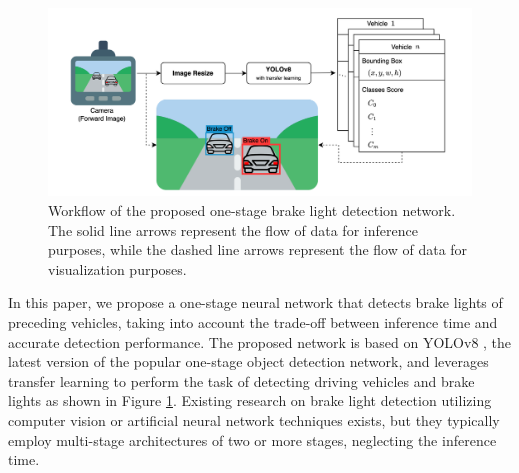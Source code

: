 
\begin{figure}[]
    \includegraphics[scale=0.5]{fig/workflow.png}
    \caption{Workflow of the proposed one-stage brake light detection network. The solid line arrows represent the flow of data for inference purposes, while the dashed line arrows represent the flow of data for visualization purposes.}
    \label{fig:workflow}
\end{figure}

In this paper, we propose a one-stage neural network that detects brake lights of preceding vehicles, taking into account the trade-off between inference time and accurate detection performance. 
The proposed network is based on YOLOv8 \cite{YOLOv8}, the latest version of the popular one-stage object detection network, and leverages transfer learning to perform the task of detecting driving vehicles and brake lights as shown in Figure \ref{fig:workflow}.
Existing research on brake light detection utilizing computer vision or artificial neural network techniques exists, but they typically employ multi-stage architectures of two or more stages, neglecting the inference time.


